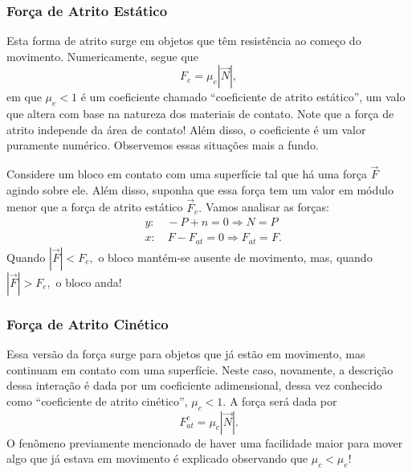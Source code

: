 \documentclass[PhysicsI/physics_notes.tex]{subfiles}
\begin{document}
\subsubsection{Força de Atrito Estático}
Esta forma de atrito surge em objetos que têm resistência ao começo do movimento. Numericamente, segue que
$$
	F_{e} = \mu_{e}|\vec{N}|,
$$
em que $\mu_{e} < 1$ é um coeficiente chamado ``coeficiente de atrito estático'', um valo que altera com base na natureza
dos materiais de contato. Note que a força de atrito independe da área de contato! Além disso, o coeficiente é um valor
puramente numérico. Observemos essas situações mais a fundo.

Considere um bloco em contato com uma superfície tal que há uma força $\vec{F}$ agindo sobre ele. Além disso,
suponha que essa força tem um valor em módulo menor que a força de atrito estático $\vec{F}_{e}.$ Vamos analisar as forças:
\begin{align*}
	 & y:\quad -P + n = 0 \Rightarrow N = P           \\
	 & x:\quad F - F_{at} = 0 \Rightarrow F_{at} = F.
\end{align*}
Quando $|\vec{F}|<F_{e},$ o bloco mantém-se ausente de movimento, mas, quando $|\vec{F}| > F_{e},$ o bloco anda!
\subsubsection{Força de Atrito Cinético}
Essa versão da força surge para objetos que já estão em movimento, mas continuam em contato com uma superfície. Neste caso,
novamente, a descrição dessa interação é dada por um coeficiente adimensional, dessa vez conhecido como ``coeficiente de atrito
cinético'', $\mu_{c} < 1$. A força será dada por
$$
	F_{at}^{c} = \mu_{c}|\vec{N}|.
$$
O fenômeno previamente mencionado de haver uma facilidade maior para mover algo que já estava em movimento é explicado observando
que $\mu_{c} < \mu_{e}!$
\end{document}
